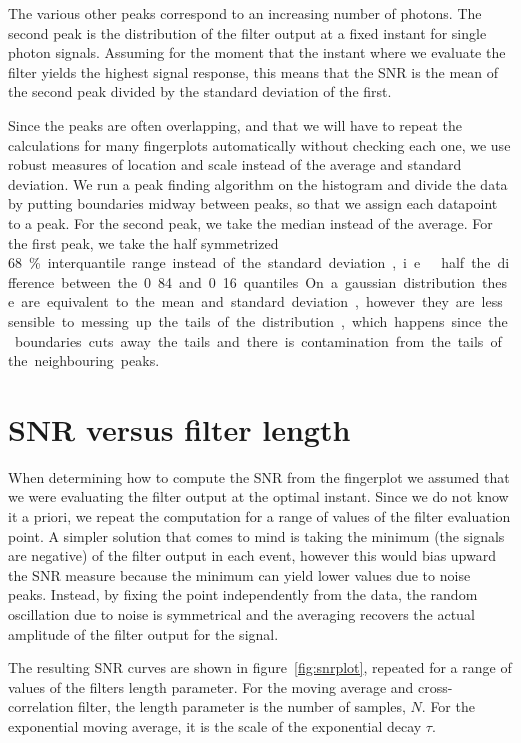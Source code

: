 The various other peaks correspond to an increasing number of photons. The
second peak is the distribution of the filter output at a fixed instant for
single photon signals. Assuming for the moment that the instant where we
evaluate the filter yields the highest signal response, this means that the SNR
is the mean of the second peak divided by the standard deviation of the first.

Since the peaks are often overlapping, and that we will have to repeat the
calculations for many fingerplots automatically without checking each one, we
use robust measures of location and scale instead of the average and standard
deviation. We run a peak finding algorithm on the histogram and divide the data
by putting boundaries midway between peaks, so that we assign each datapoint to
a peak. For the second peak, we take the median instead of the average. For the
first peak, we take the half symmetrized \SI{68}\% interquantile range instead
of the standard deviation, i.e.\ half the difference between the 0.84 and 0.16
quantiles. On a gaussian distribution these are equivalent to the mean and
standard deviation, however they are less sensible to messing up the tails of
the distribution, which happens since the boundaries cuts away the tails and
there is contamination from the tails of the neighbouring peaks.

\section{SNR versus filter length}

When determining how to compute the SNR from the fingerplot we assumed that we
were evaluating the filter output at the optimal instant. Since we do not know
it a priori, we repeat the computation for a range of values of the filter
evaluation point. A simpler solution that comes to mind is taking the minimum
(the signals are negative) of the filter output in each event, however this
would bias upward the SNR measure because the minimum can yield lower values
due to noise peaks. Instead, by fixing the point independently from the data,
the random oscillation due to noise is symmetrical and the averaging recovers
the actual amplitude of the filter output for the signal.

The resulting SNR curves are shown in figure~\ref{fig:snrplot}, repeated for a
range of values of the filters length parameter. For the moving average and
cross-correlation filter, the length parameter is the number of samples, $N$.
For the exponential moving average, it is the scale of the exponential decay
$\tau$.

